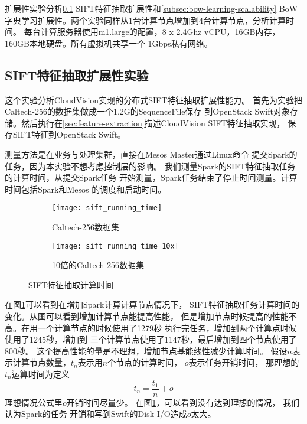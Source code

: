 扩展性实验分析\ref{subsec:sift-scalability} SIFT特征抽取扩展性和\ref{subsec:bow-learning-scalability}
BoW字典学习扩展性。两个实验同样从1台计算节点增加到4台计算节点，分析计算时间。
每台计算服务器使用m1.large的配置，8 x 2.4Ghz vCPU，16GB内存，160GB本地硬盘。所有虚拟机共享一个
1Gbps私有网络。

\subsection{SIFT特征抽取扩展性实验}
\label{subsec:sift-scalability}
这个实验分析CloudVision实现的分布式SIFT特征抽取扩展性能力。
首先为实验把Caltech-256的数据集做成一个1.2G的SequenceFile保存
到OpenStack Swift对象存储。然后执行在\ref{sec:feature-extraction}描述CloudVision SIFT特征抽取实现，
保存SIFT特征到OpenStack Swift。

测量方法是在业务与处理集群，直接在Mesos Master通过Linux命令
提交Spark的任务，因为本实验不想考虑控制层的影响。
我们测量Spark的SIFT特征抽取任务的计算时间，从提交Spark任务
开始测量，Spark任务结束了停止时间测量。计算时间包括Spark和Mesos
的调度和启动时间。

\begin{figure}[h]
  \captionsetup[subfigure]{aboveskip=2pt,belowskip=2pt}
  \centering
  \begin{subfigure}[b]{0.49\textwidth}
    \texttt{[image: sift\_running\_time]}
    \caption{Caltech-256数据集}
    \label{fig:sift-running-time}
  \end{subfigure}
  \begin{subfigure}[b]{0.49\textwidth}
    \texttt{[image: sift\_running\_time\_10x]}
    \caption{10倍的Caltech-256数据集}
    \label{fig:sift-running-time-10x}
  \end{subfigure}
  \caption{SIFT特征抽取计算时间}

\end{figure}

在图\ref{fig:sift-running-time}可以看到在增加Spark计算计算节点情况下，
SIFT特征抽取任务计算时间的变化。从图可以看到增加计算节点能提高性能，
但是增加节点时候提高的性能不高。在用一个计算节点的时候使用了1279秒
执行完任务，增加到两个计算点时候使用了1245秒，增加到
三个计算节点使用了1147秒，最后增加到四个节点使用了800秒。
这个提高性能的量是不理想，增加节点基能线性减少计算时间。
假设$n$表示计算节点数量，$t_n$表示用$n$个节点的计算时间，
$o$表示任务开销时间，
那理想的$t_n$运算时间为定义
\begin{equation} \label{eq:running-time}
t_n = \frac{t_1}{n} + o
\end{equation}
理想情况公式里$o$开销时间尽量少。
在图\ref{fig:sift-running-time}，可以看到没有达到理想的情况，
我们认为Spark的任务
开销和写到Swift的Disk I/O造成$o$太大。

